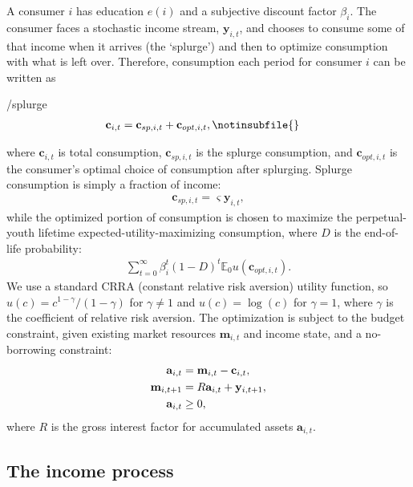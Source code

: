 \documentclass[\econtexRoot/HAFiscal]{subfiles}
\begin{document}
A consumer $i$ has education $e(i)$ and a subjective discount factor $\beta_i$. The consumer faces a stochastic income stream, $\mathbf{y}_{i,t}$, and chooses to consume some of that income when it arrives (the `splurge') and then to optimize consumption with what is left over. Therefore, consumption each period for consumer $i$ can be written as
\begin{verbatimwrite}{\EqDir/splurge}
\begin{align}
  \mathbf{c}_{i,t} &= \mathbf{c}_{sp,i,t} + \mathbf{c}_{opt,i,t}, \notinsubfile{\label{sec:model}}
\end{align}
\end{verbatimwrite}

where $\mathbf{c}_{i,t}$ is total consumption, $\mathbf{c}_{sp,i,t}$ is the splurge consumption, and $\mathbf{c}_{opt,i,t}$ is the consumer's optimal choice of consumption after splurging. Splurge consumption is simply a fraction of income:
\begin{align}
  \mathbf{c}_{sp,i,t} = \varsigma \mathbf{y}_{i,t},
\end{align}
while the optimized portion of consumption is chosen to maximize the perpetual-youth lifetime expected-utility-maximizing consumption, where $D$ is the end-of-life probability:
\begin{align}
  \sum_{t=0}^{\infty}\beta_i^t (1-D)^t \mathbb{E}_0 u(\mathbf{c}_{opt,i,t}).
\end{align}
We use a standard CRRA (constant relative risk aversion) utility function, so $u(c) = c^{1-\gamma}/(1-\gamma)$ for $\gamma \neq 1$ and $u(c) = \log(c)$ for $\gamma=1$, where $\gamma$ is the coefficient of relative risk aversion. The optimization is subject to the budget constraint, given existing market resources $\mathbf{m}_{i,t}$ and income state, and a no-borrowing constraint: 
\begin{align}
  \mathbf{a}_{i,t} &= \mathbf{m}_{i,t} - \mathbf{c}_{i,t}, \notag \\ 
  \mathbf{m}_{i,t+1} &= R \mathbf{a}_{i,t} + \mathbf{y}_{i,t+1}, \\
  \mathbf{a}_{i,t} &\geq 0,   \notag
\end{align}
where $R$ is the gross interest factor for accumulated assets $\mathbf{a}_{i,t}$.

\hypertarget{the-income-process}{}\par\subsection{The income process}
\end{document}
